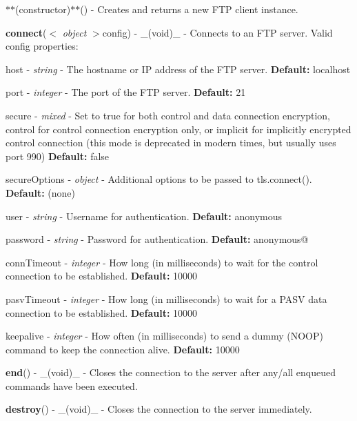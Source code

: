 \begin{DoxyItemize}
\item $\ast$$\ast$(constructor)$\ast$$\ast$() -\/ Creates and returns a new F\+TP client instance.
\item {\bfseries connect}($<$ {\itshape object} $>$config) -\/ \+\_\+(void)\+\_\+ -\/ Connects to an F\+TP server. Valid config properties\+:
\begin{DoxyItemize}
\item host -\/ {\itshape string} -\/ The hostname or IP address of the F\+TP server. {\bfseries Default\+:} \textquotesingle{}localhost\textquotesingle{}
\item port -\/ {\itshape integer} -\/ The port of the F\+TP server. {\bfseries Default\+:} 21
\item secure -\/ {\itshape mixed} -\/ Set to true for both control and data connection encryption, \textquotesingle{}control\textquotesingle{} for control connection encryption only, or \textquotesingle{}implicit\textquotesingle{} for implicitly encrypted control connection (this mode is deprecated in modern times, but usually uses port 990) {\bfseries Default\+:} false
\item secure\+Options -\/ {\itshape object} -\/ Additional options to be passed to {\ttfamily tls.\+connect()}. {\bfseries Default\+:} (none)
\item user -\/ {\itshape string} -\/ Username for authentication. {\bfseries Default\+:} \textquotesingle{}anonymous\textquotesingle{}
\item password -\/ {\itshape string} -\/ Password for authentication. {\bfseries Default\+:} \textquotesingle{}anonymous@\textquotesingle{}
\item conn\+Timeout -\/ {\itshape integer} -\/ How long (in milliseconds) to wait for the control connection to be established. {\bfseries Default\+:} 10000
\item pasv\+Timeout -\/ {\itshape integer} -\/ How long (in milliseconds) to wait for a P\+A\+SV data connection to be established. {\bfseries Default\+:} 10000
\item keepalive -\/ {\itshape integer} -\/ How often (in milliseconds) to send a \textquotesingle{}dummy\textquotesingle{} (N\+O\+OP) command to keep the connection alive. {\bfseries Default\+:} 10000
\end{DoxyItemize}
\item {\bfseries end}() -\/ \+\_\+(void)\+\_\+ -\/ Closes the connection to the server after any/all enqueued commands have been executed.
\item {\bfseries destroy}() -\/ \+\_\+(void)\+\_\+ -\/ Closes the connection to the server immediately.
\end{DoxyItemize}

